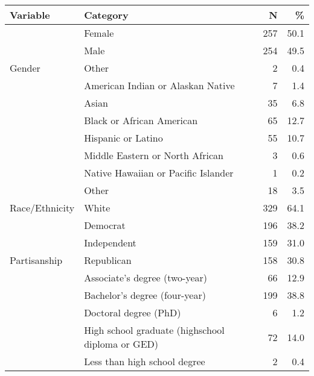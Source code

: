 \begin{table}[H]
\centering
\caption{}
\centering
\begin{tabular}[t]{llrr}
\toprule
Variable & Category & N & \%\\
\midrule
 & Female & 257 & 50.1\\

 & Male & 254 & 49.5\\

\multirow[t]{-3}{*}{\raggedright\arraybackslash Gender} & Other & 2 & 0.4\\

 & American Indian or Alaskan Native & 7 & 1.4\\

 & Asian & 35 & 6.8\\

 & Black or African American & 65 & 12.7\\

 & Hispanic or Latino & 55 & 10.7\\

 & Middle Eastern or North African & 3 & 0.6\\

 & Native Hawaiian or Pacific Islander & 1 & 0.2\\

 & Other & 18 & 3.5\\

\multirow[t]{-8}{*}{\raggedright\arraybackslash Race/Ethnicity} & White & 329 & 64.1\\

 & Democrat & 196 & 38.2\\

 & Independent & 159 & 31.0\\

\multirow[t]{-3}{*}{\raggedright\arraybackslash Partisanship} & Republican & 158 & 30.8\\

 & Associate's degree (two-year) & 66 & 12.9\\

 & Bachelor's degree (four-year) & 199 & 38.8\\

 & Doctoral degree (PhD) & 6 & 1.2\\

 & High school graduate (highschool diploma or GED) & 72 & 14.0\\

 & Less than high school degree & 2 & 0.4\\


\end{tabular}
\end{table}
